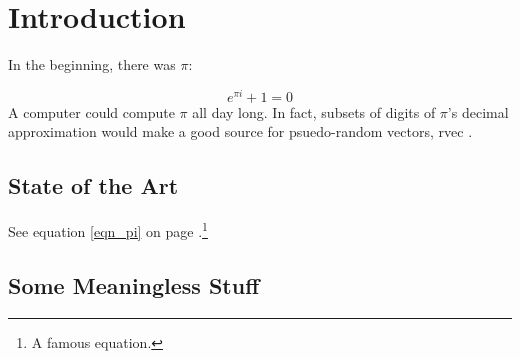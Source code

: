 \documentclass[letterpaper,12pt,titlepage,oneside,final]{book}
\let\origdoublepage\cleardoublepage
\newcommand{\clearemptydoublepage}{%
  \clearpage{\pagestyle{empty}\origdoublepage}}
\let\cleardoublepage\clearemptydoublepage
\begin{document}
\renewcommand*{\abbreviationsname}{List of Abbreviations}
\printglossary[type=abbreviations]
\cleardoublepage
{}		%

\printglossary[type=symbols]
\cleardoublepage
{}		%



\chapter{Introduction}
In the beginning, there was $\pi$:

\begin{equation}
   e^{\pi i} + 1 = 0  \label{eqn_pi}
\end{equation}
A \gls{computer} could compute $\pi$ all day long. In fact, subsets of digits of $\pi$'s decimal approximation would make a good source for psuedo-random vectors, \gls{rvec} . 

\section{State of the Art}

See equation \ref{eqn_pi} on page \pageref{eqn_pi}.\footnote{A famous equation.}

\section{Some Meaningless Stuff}
\end{document}
